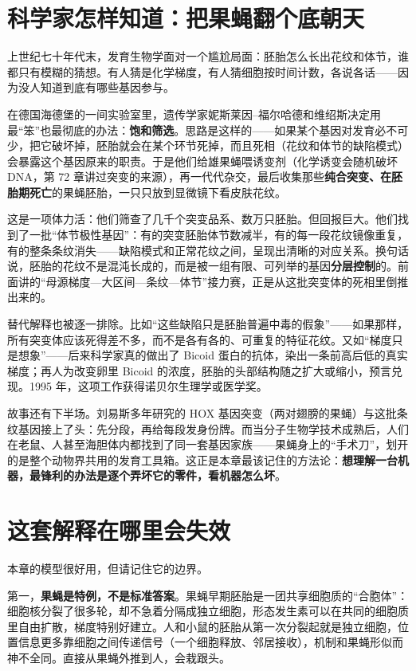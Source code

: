 \section{科学家怎样知道：把果蝇翻个底朝天}

\begin{zhengju}
上世纪七十年代末，发育生物学面对一个尴尬局面：胚胎怎么长出花纹和体节，谁都只有模糊的猜想。有人猜是化学梯度，有人猜细胞按时间计数，各说各话——因为没人知道到底有哪些基因参与。

在德国海德堡的一间实验室里，遗传学家妮斯莱因–福尔哈德和维绍斯决定用最“笨”也最彻底的办法：\textbf{饱和筛选}。思路是这样的——如果某个基因对发育必不可少，把它破坏掉，胚胎就会在某个环节死掉，而且死相（花纹和体节的缺陷模式）会暴露这个基因原来的职责。于是他们给雄果蝇喂诱变剂（化学诱变会随机破坏 DNA，第 72 章讲过突变的来源），再一代代杂交，最后收集那些\textbf{纯合突变、在胚胎期死亡}的果蝇胚胎，一只只放到显微镜下看皮肤花纹。

这是一项体力活：他们筛查了几千个突变品系、数万只胚胎。但回报巨大。他们找到了一批“体节极性基因”：有的突变胚胎体节数减半，有的每一段花纹镜像重复，有的整条条纹消失——缺陷模式和正常花纹之间，呈现出清晰的对应关系。换句话说，胚胎的花纹不是混沌长成的，而是被一组有限、可列举的基因\textbf{分层控制}的。前面讲的“母源梯度—大区间—条纹—体节”接力赛，正是从这批突变体的死相里倒推出来的。

替代解释也被逐一排除。比如“这些缺陷只是胚胎普遍中毒的假象”——如果那样，所有突变体应该死得差不多，而不是各有各的、可重复的特征花纹。又如“梯度只是想象”——后来科学家真的做出了 Bicoid 蛋白的抗体，染出一条前高后低的真实梯度；再人为改变卵里 Bicoid 的浓度，胚胎的头部结构随之扩大或缩小，预言兑现。1995 年，这项工作获得诺贝尔生理学或医学奖。

故事还有下半场。刘易斯多年研究的 HOX 基因突变（两对翅膀的果蝇）与这批条纹基因接上了头：先分段，再给每段发身份牌。而当分子生物学技术成熟后，人们在老鼠、人甚至海胆体内都找到了同一套基因家族——果蝇身上的“手术刀”，划开的是整个动物界共用的发育工具箱。这正是本章最该记住的方法论：\textbf{想理解一台机器，最锋利的办法是逐个弄坏它的零件，看机器怎么坏}。
\end{zhengju}

\section{这套解释在哪里会失效}

本章的模型很好用，但请记住它的边界。

第一，\textbf{果蝇是特例，不是标准答案}。果蝇早期胚胎是一团共享细胞质的“合胞体”：细胞核分裂了很多轮，却不急着分隔成独立细胞，形态发生素可以在共同的细胞质里自由扩散，梯度特别好建立。人和小鼠的胚胎从第一次分裂起就是独立细胞，位置信息更多靠细胞之间传递信号（一个细胞释放、邻居接收），机制和果蝇形似而神不全同。直接从果蝇外推到人，会栽跟头。

